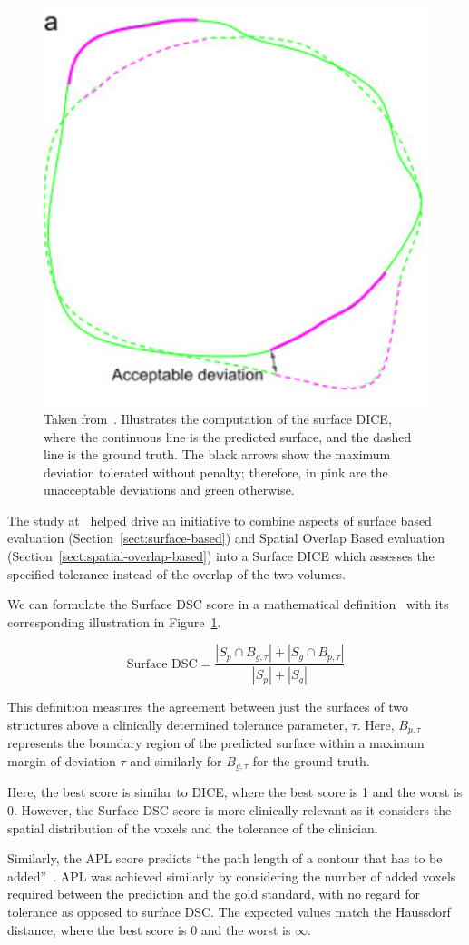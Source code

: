 \documentclass[11pt,twoside]{report}
\begin{document}
\begin{figure}
  \centering
  \includegraphics[width=0.3\linewidth]{../figures/Surface-dice.png}
  \caption{Taken from~\cite{Nikolov2021-xe}. Illustrates the computation of the surface DICE, where the continuous line is the predicted surface, and the dashed line is the ground truth. The black arrows show the maximum deviation tolerated without penalty; therefore, in pink are the unacceptable deviations and green otherwise.}\label{fig:surface-dice}
\end{figure}

The study at~\cite{Sherer2021-le} helped drive an initiative to combine aspects of surface based evaluation (Section~\ref{sect:surface-based}) and Spatial Overlap Based evaluation (Section~\ref{sect:spatial-overlap-based}) into a Surface DICE which assesses the specified tolerance instead of the overlap of the two volumes.

We can formulate the Surface DSC score in a mathematical definition~\cite{Sherer2021-le} with its corresponding illustration in Figure~\ref{fig:surface-dice}.

\begin{equation*}
 \text{Surface DSC} = \frac{|S_p \cap B_{g,\tau}| + |S_g \cap B_{p,\tau}|}{|S_p| + |S_g|}
\end{equation*}

This definition measures the agreement between just the surfaces of two structures above a clinically determined tolerance parameter, $\tau$. Here, $B_{p,\tau}$ represents the boundary region of the predicted surface within a maximum margin of deviation $\tau$ and similarly for $B_{g,\tau}$ for the ground truth.

Here, the best score is similar to DICE, where the best score is 1 and the worst is 0. However, the Surface DSC score is more clinically relevant as it considers the spatial distribution of the voxels and the tolerance of the clinician. 

Similarly, the APL score predicts ``the path length of a contour that has to be added''~\cite{APL}. APL was achieved similarly by considering the number of added voxels required between the prediction and the gold standard, with no regard for tolerance as opposed to surface DSC. The expected values match the Haussdorf distance, where the best score is 0 and the worst is $\infty$.
\end{document}
